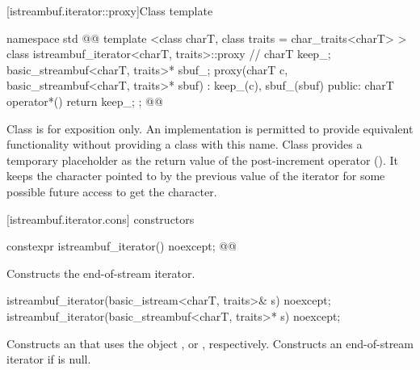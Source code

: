[istreambuf.iterator::proxy]{Class template }

%
\begin{codeblock}
namespace std { @@
  template <class charT, class traits = char_traits<charT> >
  class istreambuf_iterator<charT, traits>::proxy { // \expos
    charT keep_;
    basic_streambuf<charT, traits>* sbuf_;
    proxy(charT c, basic_streambuf<charT, traits>* sbuf)
      : keep_(c), sbuf_(sbuf) { }
  public:
    charT operator*() { return keep_; }
  };
}@\newtxt{\}\}\}}@
\end{codeblock}

\pnum
Class
is for exposition only.
An implementation is permitted to provide equivalent functionality without
providing a class with this name.
Class
provides a temporary
placeholder as the return value of the post-increment operator
().
It keeps the character pointed to by the previous value
of the iterator for some possible future access to get the character.

[istreambuf.iterator.cons]{ constructors}


%
\begin{itemdecl}
constexpr istreambuf_iterator() noexcept;
@@
\end{itemdecl}

\begin{itemdescr}
\pnum
\effects
Constructs the end-of-stream iterator.
\end{itemdescr}

%
\begin{itemdecl}
istreambuf_iterator(basic_istream<charT, traits>& s) noexcept;
istreambuf_iterator(basic_streambuf<charT, traits>* s) noexcept;
\end{itemdecl}

\begin{itemdescr}
\pnum
\effects
Constructs an
that uses the
object
,
or
,
respectively.
Constructs an end-of-stream iterator if
is null.
\end{itemdescr}


